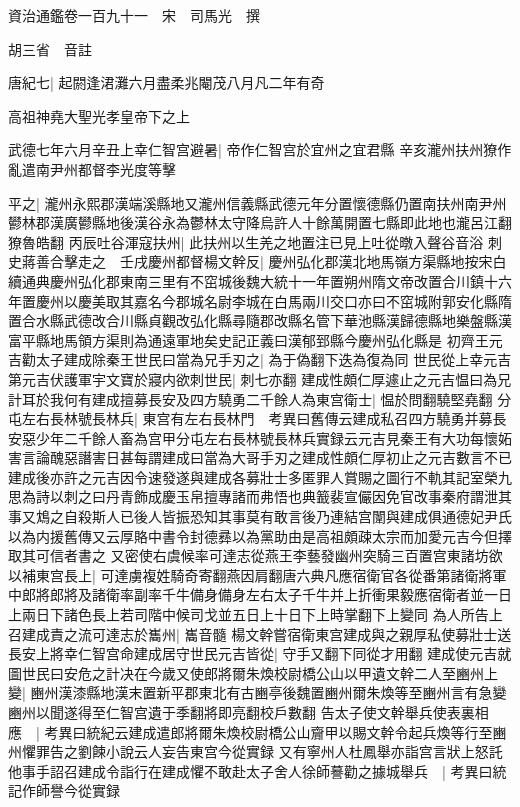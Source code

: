 資治通鑑卷一百九十一　宋　司馬光　撰

胡三省　音註

唐紀七|{
	起閼逢涒灘六月盡柔兆閹茂八月凡二年有奇}


高祖神堯大聖光孝皇帝下之上

武德七年六月辛丑上幸仁智宫避暑|{
	帝作仁智宫於宜州之宜君縣}
辛亥瀧州扶州獠作亂遣南尹州都督李光度等擊

平之|{
	瀧州永熙郡漢端溪縣地又瀧州信義縣武德元年分置懷德縣仍置南扶州南尹州鬰林郡漢廣鬰縣地後漢谷永為鬱林太守降烏許人十餘萬開置七縣即此地也瀧呂江翻獠魯皓翻}
丙辰吐谷渾寇扶州|{
	此扶州以生羌之地置注已見上吐從暾入聲谷音浴}
刺史蔣善合擊走之　壬戌慶州都督楊文幹反|{
	慶州弘化郡漢北地馬嶺方渠縣地按宋白續通典慶州弘化郡東南三里有不窋城後魏大統十一年置朔州隋文帝改置合川鎮十六年置慶州以慶美取其嘉名今郡城名尉李城在白馬兩川交口亦曰不窋城附郭安化縣隋置合水縣武德改合川縣貞觀改弘化縣尋隨郡改縣名管下華池縣漢歸德縣地樂盤縣漢富平縣地馬領方渠則為通遠軍地矣史記正義曰漢郁郅縣今慶州弘化縣是}
初齊王元吉勸太子建成除秦王世民曰當為兄手刃之|{
	為于偽翻下迭為復為同}
世民從上幸元吉第元吉伏護軍宇文寶於寢内欲刺世民|{
	刺七亦翻}
建成性頗仁厚遽止之元吉愠曰為兄計耳於我何有建成擅募長安及四方驍勇二千餘人為東宫衛士|{
	愠於問翻驍堅堯翻}
分屯左右長林號長林兵|{
	東宫有左右長林門　考異曰舊傳云建成私召四方驍勇并募長安惡少年二千餘人畜為宫甲分屯左右長林號長林兵實録云元吉見秦王有大功每懷妬害言論醜惡譖害日甚每謂建成曰當為大哥手刃之建成性頗仁厚初止之元吉數言不已建成後亦許之元吉因令速發遂與建成各募壯士多匿罪人賞賜之圖行不軌其記室榮九思為詩以刺之曰丹青飾成慶玉帛擅專諸而弗悟也典籖裴宣儼因免官改事秦府謂泄其事又鴆之自殺斯人已後人皆振恐知其事莫有敢言後乃連結宫闈與建成俱通德妃尹氏以為内援舊傳又云厚賂中書令封德彞以為黨助由是高祖頗疎太宗而加愛元吉今但擇取其可信者書之}
又密使右虞候率可達志從燕王李藝發幽州突騎三百置宫東諸坊欲以補東宫長上|{
	可達虜複姓騎奇寄翻燕因肩翻唐六典凡應宿衛官各從番第諸衛將軍中郎將郎將及諸衛率副率千牛備身備身左右太子千牛并上折衝果毅應宿衛者並一日上兩日下諸色長上若司階中候司戈並五日上十日下上時掌翻下上變同}
為人所告上召建成責之流可達志於巂州|{
	巂音髓}
楊文幹嘗宿衛東宫建成與之親厚私使募壯士送長安上將幸仁智宫命建成居守世民元吉皆從|{
	守手又翻下同從才用翻}
建成使元吉就圖世民曰安危之計决在今歲又使郎將爾朱煥校尉橋公山以甲遺文幹二人至豳州上變|{
	豳州漢漆縣地漢末置新平郡東北有古豳亭後魏置豳州爾朱煥等至豳州言有急變豳州以聞遂得至仁智宫遺于季翻將即亮翻校戶數翻}
告太子使文幹舉兵使表裏相應　|{
	考異曰統紀云建成遣郎將爾朱煥校尉橋公山齎甲以賜文幹令起兵煥等行至豳州懼罪告之劉餗小說云人妄告東宫今從實録}
又有寧州人杜鳳舉亦詣宫言狀上怒託他事手詔召建成令詣行在建成懼不敢赴太子舍人徐師謩勸之據城舉兵　|{
	考異曰統記作師譽今從實録}
